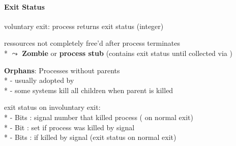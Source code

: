 \paragraph{Exit Status}
\begin{items}
  \item voluntary exit: process returns exit status (integer)
  \item ressources not completely free'd after process terminates \\*
    \( \leadsto \) \textbf{Zombie} or \textbf{process stub} (contains exit status until collected via )
  \item \textbf{Orphans}: Processes without parents \\*
    - usually adopted by  \\*
    - some systems kill all children when parent is killed
  \item exit status on involuntary exit: \\*
    - Bits : signal number that killed process ( on normal exit) \\*
    - Bit : set if process was killed by signal \\*
    - Bits :  if killed by signal (exit status on normal exit)
\end{items}
